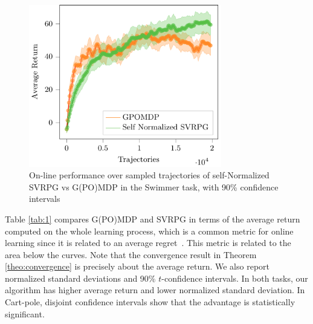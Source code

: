 \begin{figure}[h]
	\begin{minipage}[h]{1\textwidth}
		\centering
		\includegraphics[width=0.75\textwidth]{Images/Experiments/swimmer_self_normalized_SVRPG_vs_GPOMDP_tex.pdf}
		\vspace{-0.1in}
		\caption{On-line performance over sampled trajectories of self-Normalized \acs{SVRPG} vs G(PO)MDP in the Swimmer task, with 90\% confidence intervals}
		\label{fig:swimmerone}
	\end{minipage}
	\vspace{-0.15in}
\end{figure}


Table \ref{tab:1} compares G(PO)MDP and \acs{SVRPG} in terms of the average return computed on the whole learning process, which is a common metric for online learning since it is related to an average regret~\citep[\eg][]{duan2016benchmarking}. This metric is related to the area below the curves. Note that the convergence result in Theorem \ref{theo:convergence} is precisely about the average return. We also report normalized standard deviations and 90\% $t$-confidence intervals.
In both tasks, our algorithm has higher average return and lower normalized standard deviation.
In Cart-pole, disjoint confidence intervals show that the advantage is statistically significant.

